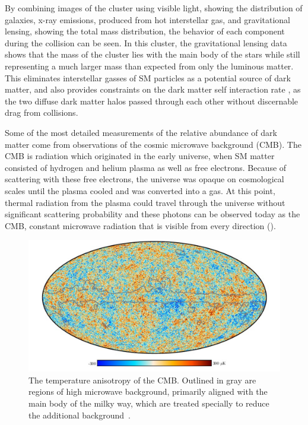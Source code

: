 By combining images of the cluster using visible light, showing the distribution of galaxies, x-ray emissions, produced from hot interstellar gas, and gravitational lensing, showing the total mass distribution, the behavior of each component during the collision can be seen. 
In this cluster, the gravitational lensing data shows that the mass of the cluster lies with the main body of the stars while still representing a much larger mass than expected from only the luminous matter. 
This eliminates interstellar gasses of SM particles as a potential source of dark matter, and also provides constraints on the dark matter self interaction rate \cite{Randall_2008}, as the two diffuse dark matter halos passed through each other without discernable drag from collisions.

Some of the most detailed measurements of the relative abundance of dark matter come from observations of the cosmic microwave background (CMB).
The CMB is radiation which originated in the early universe, when SM matter consisted of hydrogen and helium plasma as well as free electrons.
Because of scattering with these free electrons, the universe was opaque on cosmological scales until the plasma cooled and was converted into a gas. 
At this point, thermal radiation from the plasma could travel through the universe without significant scattering probability and these photons can be observed today as the CMB, constant microwave radiation that is visible from every direction ().

\begin{figure}[htpb]
	\label{fig:CMB}
	\centering
	\includegraphics[width=1.1\textwidth]{figures/cmb.png}
	\caption[The CMB temperature anisotropy]{The temperature anisotropy of the CMB. Outlined in gray are regions of high microwave background, primarily aligned with the main body of the milky way, which are treated specially to reduce the additional background~\cite{PlanckCMB}.}
\end{figure}

